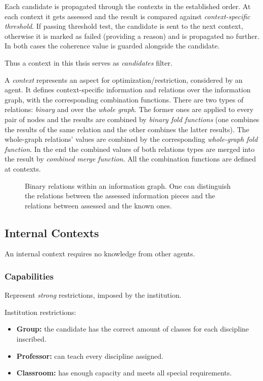 Each candidate is propagated through the contexts in the established
order. At each context it gets assessed and the result is compared
against \emph{context-specific threshold}. If passing threshold test,
the candidate is sent to the next context, otherwise it is marked as failed
(providing a reason) and is propagated no further. In both cases the coherence
value is guarded alongside the candidate.

Thus a context in this thsis serves as \emph{candidates} filter.
\medskip

\noindent
A \emph{context} represents an aspect for optimization/restriction, considered
by an agent. It defines context-specific information and relations over the
information graph, with the corresponding combination functions. There are
two types of relations: \emph{binary} and over the \emph{whole graph}. The former ones
are applied to every pair of nodes and the results are combined by
\emph{binary fold functions} (one combines the results of the same relation
and the other combines the latter results). The whole-graph relations' values are
combined by the corresponding \emph{whole-graph fold function}. In the end the
combined values of both relations types are merged into the result by
\emph{combined merge function}. All the combination functions are defined at
contexts.

\begin{figure}[h]
  \centering
  \fbox{  }
  \caption{Binary relations within an information graph. One can
           distinguish the relations between the assessed information pieces
           and the relations between assessed and the known ones.
          }
\end{figure}


\subsection{Internal Contexts}

An internal context requires no knowledge from other agents.

\subsubsection{Capabilities}

Represent \emph{strong} restrictions, imposed by the institution.

Institution restrictions:
\begin{itemize}
\item \textbf{Group:} the candidate has the correct amount of classes for each
  discipline inscribed.
\item \textbf{Professor:} can teach every discipline assigned.
\item \textbf{Classroom:} has enough capacity and meets all special requirements.
\end{itemize}

